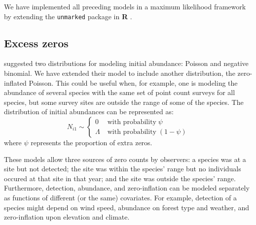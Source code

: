 \documentclass[12pt]{article}
\begin{document}
We have implemented all preceding models in
a maximum likelihood framework by extending the
\texttt{unmarked} package
\citep{fiske_chandler:2011} in \textbf{R} \citep{R-2012}.


\subsection{Excess zeros}

\citet{dail_madsen:2011} suggested two distributions for modeling
initial abundance: Poisson and negative binomial. We have
extended their model to include another distribution, the zero-inflated
Poisson. This could be useful when, for example, one is modeling
the abundance of several species with the same set of point
count surveys for all species, but some survey sites are
outside the range of some of the species. The distribution
of initial abundances can be represented as:
\begin{equation}
N_{i1} \sim \left\{
\begin{aligned}
0 &\; \text{with probability} \; \psi \\
\Lambda &\; \text{with probability} \; (1-\psi)
\end{aligned} \right.
\label{eq:ZIP}
\end{equation}
where $\psi$ represents the proportion of extra zeros.

These models allow three sources of zero counts by observers: a
species was at a site but not detected; the site was within the
species' range but no individuals occured at that site in that
year; and the site was outside the species' range. Furthermore,
detection, abundance, and zero-inflation can be modeled separately as
functions of different (or the same) covariates. For example, detection of a
species might depend on wind speed,
abundance on forest type and weather, and zero-inflation upon elevation and
climate.  

\end{document}
